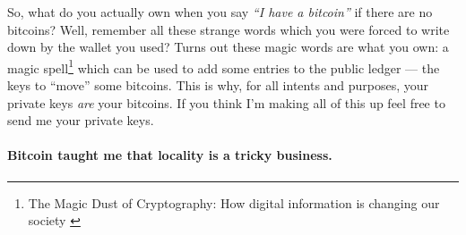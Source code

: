 So, what do you actually own when you say \textit{\enquote{I have a bitcoin}} if
there are no bitcoins? Well, remember all these strange words which you were
forced to write down by the wallet you used? Turns out these magic words are
what you own: a magic spell\footnote{The Magic Dust of Cryptography: How digital
information is changing our society \cite{gigi:magic-spell}} which can be used
to add some entries to the public ledger --- the keys to ``move'' some bitcoins.
This is why, for all intents and purposes, your private keys \textit{are} your
bitcoins. If you think I'm making all of this up feel free to send me your
private keys.

\paragraph{Bitcoin taught me that locality is a tricky business.}

%
%
%
%
%
%
%
